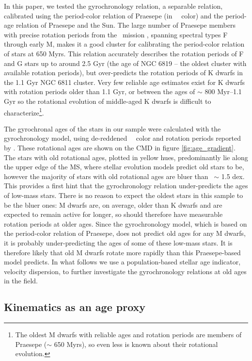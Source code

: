 In this paper, we tested the \citet{angus2019} gyrochronology relation, a
separable relation, calibrated using the period-color relation of Praesepe (in
\gaia\ \gcolor\ color) and the period-age relation of Praesepe and the Sun.
The large number of Praesepe members with precise rotation periods from the
\ktwo\ mission \citep{douglas2017, rebull2017}, spanning spectral types F
through early M, makes it a good cluster for calibrating the period-color
relation of stars at 650 Myrs.
This relation accurately describes the rotation periods of F and G stars up to
around 2.5 Gyr (the age of NGC 6819 -- the oldest cluster with available
rotation periods), but over-predicts the rotation periods of K dwarfs in the
1.1 Gyr NGC 6811 cluster.
Very few reliable age estimates exist for K dwarfs with rotation periods older
than 1.1 Gyr, or between the ages of $\sim$ 800 Myr--1.1 Gyr so the rotational
evolution of middle-aged K dwarfs is difficult to characterize\footnote{The
oldest M dwarfs with reliable ages and rotation periods are members of
Praesepe ($\sim$ 650 Myrs), so even less is known about their rotational
evolution.}.

The gyrochronal ages of the stars in our sample were calculated with the
\citep{angus2019} gyrochronology model, using de-reddened \Gaia\ \gcolor\
color and rotation periods reported by \mct.
These rotational ages are shown on the CMD in figure \ref{fig:age_gradient}.
The stars with old rotational ages, plotted in yellow hues, predominantly lie
along the upper edge of the MS, where stellar evolution models predict old
stars to be, however the majority of stars with old rotational ages are bluer
than \gcolor\ $\sim$ 1.5 dex.
This provides a first hint that the \citet{angus2019} gyrochronology relation
under-predicts the ages of low-mass stars.
There is no reason to expect the oldest stars in this sample to be the bluer
ones: M dwarfs are, on average, older than K dwarfs and are expected to remain
active for longer, so should therefore have measurable rotation periods at
older ages.
Since the \citet{angus2019} gyrochronology model, which is based on the
period-color relation of Praesepe, does not predict old ages for any M dwarfs,
it is probably under-predicting the ages of some of these low-mass stars.
It is therefore likely that old M dwarfs rotate more rapidly than this
Praesepe-based model predicts.
In what follows we use a population-based stellar age indicator, velocity
dispersion, to further investigate the gyrochronology relations at old ages in
the field.

\subsection{Kinematics as an age proxy}

